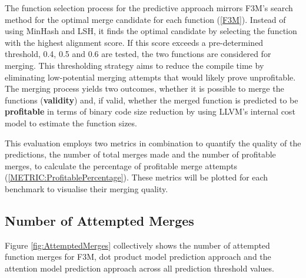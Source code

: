 The function selection process for the predictive approach mirrors F3M's search method for the optimal merge candidate for each function (\ref{F3M}). Instead of using MinHash and LSH, it finds the optimal candidate by selecting the function with the highest alignment score. If this score exceeds a pre-determined threshold, 0.4, 0.5 and 0.6 are tested, the two functions are considered for merging. This thresholding strategy aims to reduce the compile time by eliminating low-potential merging attempts that would likely prove unprofitable. The merging process yields two outcomes, whether it is possible to merge the functions (\textbf{validity}) and, if valid, whether the merged function is predicted to be \textbf{profitable} in terms of binary code size reduction by using LLVM's internal cost model to estimate the function sizes.

This evaluation employs two metrics in combination to quantify the quality of the predictions, the number of total merges made and the number of profitable merges, to calculate the percentage of profitable merge attempts (\ref{METRIC:ProfitablePercentage}). These metrics will be plotted for each benchmark to visualise their merging quality.

\subsection{Number of Attempted Merges}
Figure \ref{fig:AttemptedMerges} collectively shows the number of attempted function merges for F3M, dot product model prediction approach and the attention model prediction approach across all prediction threshold values.

